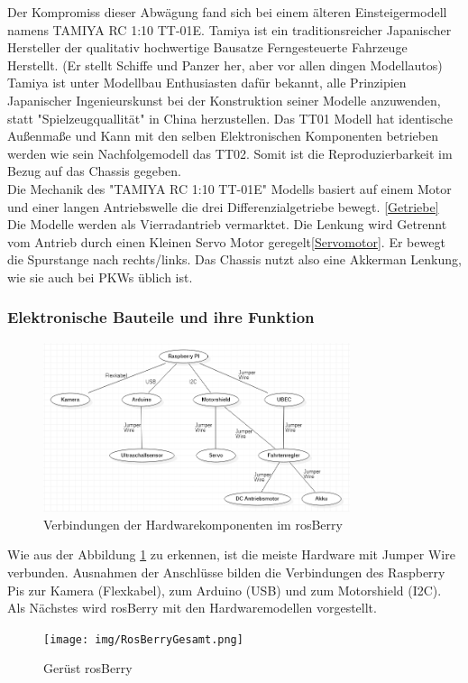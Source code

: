 \documentclass[conference]{IEEEtran}
\begin{document}
Der Kompromiss dieser Abwägung fand sich bei einem älteren Einsteigermodell namens TAMIYA RC 1:10 TT-01E. Tamiya ist ein traditionsreicher Japanischer Hersteller der qualitativ hochwertige Bausatze Ferngesteuerte Fahrzeuge Herstellt. (Er stellt Schiffe und Panzer her, aber vor allen dingen Modellautos) Tamiya ist unter Modellbau Enthusiasten dafür bekannt, alle Prinzipien Japanischer Ingenieurskunst bei der Konstruktion seiner Modelle anzuwenden, statt "Spielzeugquallität" in China herzustellen. Das TT01 Modell hat identische Außenmaße und Kann mit den selben Elektronischen Komponenten betrieben werden wie sein Nachfolgemodell das TT02. Somit ist die Reproduzierbarkeit im Bezug auf das Chassis gegeben.
\\
Die Mechanik des "TAMIYA RC 1:10 TT-01E" Modells basiert auf einem Motor und einer langen Antriebswelle die drei Differenzialgetriebe bewegt. \ref{Getriebe} Die Modelle werden als Vierradantrieb vermarktet. Die Lenkung wird Getrennt vom Antrieb durch einen Kleinen Servo Motor geregelt\ref{Servomotor}. Er bewegt die Spurstange nach rechts/links. Das Chassis nutzt also eine Akkerman Lenkung, wie sie auch bei PKWs üblich ist.

\subsubsection{Elektronische Bauteile und ihre Funktion}
\begin{figure} %
	\centering
	\includegraphics[width=9cm]{img/Hardwarekomponenten.PNG}
	\caption{Verbindungen der Hardwarekomponenten im rosBerry}
	\label{Hardwarekomponenten}
\end{figure}

Wie aus der Abbildung \ref{Hardwarekomponenten} zu erkennen, ist die meiste Hardware mit Jumper Wire verbunden.
Ausnahmen der Anschlüsse bilden die Verbindungen des Raspberry Pis zur Kamera (Flexkabel), zum Arduino (USB) und zum Motorshield (I2C).
\\

Als Nächstes wird rosBerry mit den Hardwaremodellen vorgestellt.
\\
\begin{figure}[!ht]
	\centering
	\texttt{[image: img/RosBerryGesamt.png]}
	\caption{Gerüst rosBerry}
	\label{rosBerryGesamt}
\end{figure}
\end{document}

